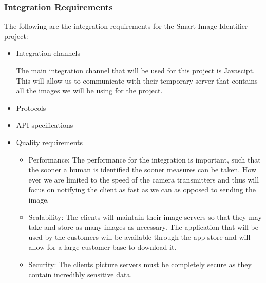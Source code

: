 \documentclass[a4paper,12pt]{report}
\begin{document}
 \subsubsection*{Integration Requirements}
 The following are the integration requirements for the Smart Image Identifier project:
 \begin{enumerate}
 	\begin{itemize}
 		\item Integration channels
			
			The main integration channel that will be used for this project is Javascipt. This will allow us to communicate with their temporary server that contains all the images we will be using for the project.
 	\end{itemize}

	\begin{itemize}
 		\item Protocols
		
		

	\end{itemize}

	\begin{itemize}
 		\item API specifications
					
		
	\end{itemize}

	\begin{itemize}
 		\item Quality requirements
			\begin{itemize}
				\item Performance: The performance for the integration is important, such that the sooner a human is identified the sooner measures can be taken. How ever we are limited to the speed of the camera transmitters and thus will focus on notifying the client as fast as we can as opposed to sending the image.
				\item Scalability: The clients will maintain their image servers so that they may take and store as many images as necessary. The application that will be used by the customers will be available through the app store and will allow for a large customer base to download it.
				\item Security: The clients picture servers must be completely secure as they contain incredibly sensitive data.
				
			\end{itemize}


	\end{itemize}
	

\end{enumerate}
\end{document}
